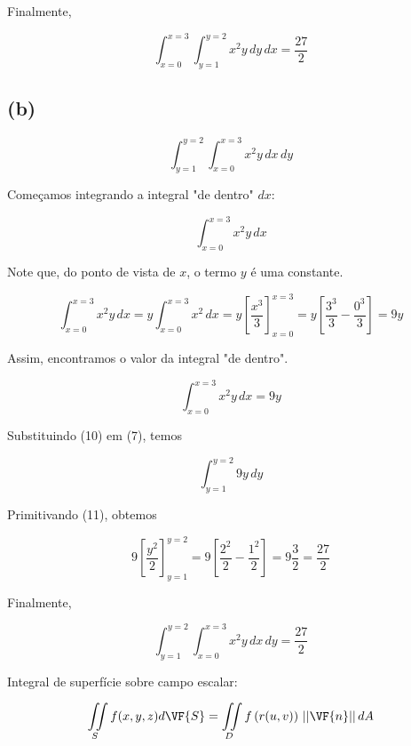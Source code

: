 Finalmente,

\[ \boxed{\int_{x=0}^{x=3} \int_{y=1}^{y=2} x^2y \, dy \, dx = \frac{27}{2}}  \]

\subsection*{(b)}

\begin{equation}
    \int_{y=1}^{y=2} \int_{x=0}^{x=3} x^2y \, dx \, dy
\end{equation}

Começamos integrando a integral "de dentro" $dx$:

\begin{equation}
    \int_{x=0}^{x=3} x^2y \, dx
\end{equation}

Note que, do ponto de vista de $x$, o termo $y$ é uma constante.

\begin{equation}
    \int_{x=0}^{x=3} x^2y \, dx =
    y\int_{x=0}^{x=3} x^2 \, dx =
    y \left[\frac{x^3}{3}\right]_{x=0}^{x=3} =
    y \left[\frac{3^3}{3} - \frac{0^3}{3}\right] =
    9y
\end{equation}

Assim, encontramos o valor da integral "de dentro".

\begin{equation}
    \int_{x=0}^{x=3} x^2y \, dx = 9y
\end{equation}

Substituindo (10) em (7), temos

\begin{equation}
    \int_{y=1}^{y=2} 9y \, dy
\end{equation}

Primitivando (11), obtemos

\begin{equation}
    9 \left[\frac{y^2}{2}\right]_{y=1}^{y=2} = 
    9 \left[\frac{2^2}{2} - \frac{1^2}{2}\right] = 
    9 \frac{3}{2} = \frac{27}{2}
\end{equation}

Finalmente,

\[ \boxed{\int_{y=1}^{y=2} \int_{x=0}^{x=3} x^2y \, dx \, dy = \frac{27}{2}}  \]

Integral de superfície sobre campo escalar:

\[ \iint\limits_S f(x,y,z) d\VF{S} = \iint\limits_D f\left(r(u, v)\right) \, ||\VF{n}|| \, dA \]

